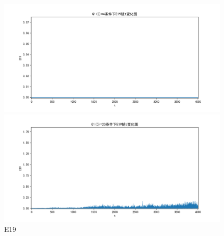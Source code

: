 \documentclass[10pt, a4paper]{article}
\begin{document}
    \begin{figure}[H]
        \begin{minipage}[t]{0.49\textwidth}
            \centering
            \includegraphics[width=\textwidth]{./q5_pics/cmp/E19.png}
        \end{minipage}
        \begin{minipage}[t]{0.49\textwidth}
            \centering
            \includegraphics[width=\textwidth]{./q5_pics/exp/E19.png}
        \end{minipage}
        \caption{E19}\label{fig:E19 in q5}
    \end{figure}
\end{document}
